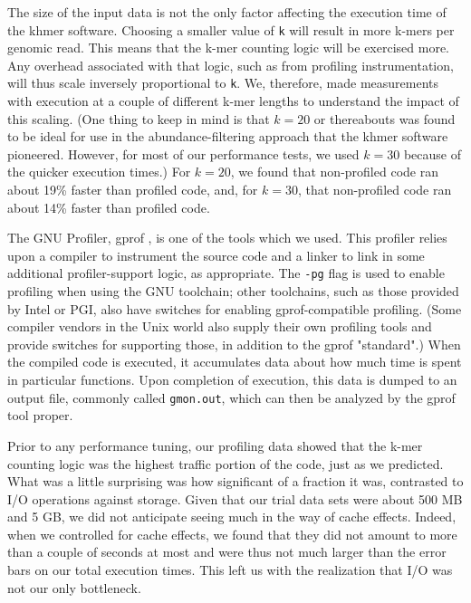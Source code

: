 \documentclass{article}
\begin{document}
The size of the input data is not the only factor affecting the execution time of the khmer software. Choosing a smaller value of \texttt{k} will result in more k-mers per genomic read. This means that the k-mer counting logic will be exercised more. Any overhead associated with that logic, such as from profiling instrumentation, will thus scale inversely proportional to \texttt{k}. We, therefore, made measurements with execution at a couple of different k-mer lengths to understand the impact of this scaling. (One thing to keep in mind is that $k = 20$ or thereabouts was found to be ideal for use in the abundance-filtering approach that the khmer software pioneered. However, for most of our performance tests, we used $k = 30$ because of the quicker execution times.) For $k = 20$, we found that non-profiled code ran about 19\% faster than profiled code, and, for $k = 30$, that non-profiled code ran about 14\% faster than profiled code.

The GNU Profiler, gprof \citep{web:gprof}, is one of the tools which we used. This profiler relies upon a compiler to instrument the source code and a linker to link in some additional profiler-support logic, as appropriate. The \texttt{-pg} flag is used to enable profiling when using the GNU toolchain; other toolchains, such as those provided by Intel or PGI, also have switches for enabling gprof-compatible profiling. (Some compiler vendors in the Unix world also supply their own profiling tools and provide switches for supporting those, in addition to the gprof "standard".) When the compiled code is executed, it accumulates data about how much time is spent in particular functions. Upon completion of execution, this data is dumped to an output file, commonly called \texttt{gmon.out}, which can then be analyzed by the gprof tool proper.

Prior to any performance tuning, our profiling data showed that the k-mer counting logic was the highest traffic portion of the code, just as we predicted. What was a little surprising was how significant of a fraction it was, contrasted to I/O operations against storage. Given that our trial data sets were about 500 MB and 5 GB, we did not anticipate seeing much in the way of cache effects. Indeed, when we controlled for cache effects, we found that they did not amount to more than a couple of seconds at most and were thus not much larger than the error bars on our total execution times. This left us with the realization that I/O was not our only bottleneck.
\end{document}
